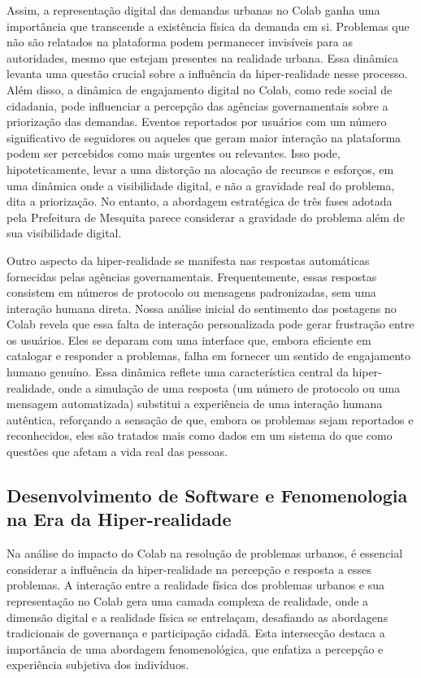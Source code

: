 Assim, a representação digital das demandas urbanas no Colab ganha uma importância que transcende a existência física da demanda em si. Problemas que não são relatados na plataforma podem permanecer invisíveis para as autoridades, mesmo que estejam presentes na realidade urbana. Essa dinâmica levanta uma questão crucial sobre a influência da hiper-realidade nesse processo. Além disso, a dinâmica de engajamento digital no Colab, como rede social de cidadania, pode influenciar a percepção das agências governamentais sobre a priorização das demandas. Eventos reportados por usuários com um número significativo de seguidores ou aqueles que geram maior interação na plataforma podem ser percebidos como mais urgentes ou relevantes. Isso pode, hipoteticamente, levar a uma distorção na alocação de recursos e esforços, em uma dinâmica onde a visibilidade digital, e não a gravidade real do problema, dita a priorização. No entanto, a abordagem estratégica de três fases adotada pela Prefeitura de Mesquita parece considerar a gravidade do problema além de sua visibilidade digital.

Outro aspecto da hiper-realidade se manifesta nas respostas automáticas fornecidas pelas agências governamentais. Frequentemente, essas respostas consistem em números de protocolo ou mensagens padronizadas, sem uma interação humana direta. Nossa análise inicial do sentimento das postagens no Colab revela que essa falta de interação personalizada pode gerar frustração entre os usuários. Eles se deparam com uma interface que, embora eficiente em catalogar e responder a problemas, falha em fornecer um sentido de engajamento humano genuíno. Essa dinâmica reflete uma característica central da hiper-realidade, onde a simulação de uma resposta (um número de protocolo ou uma mensagem automatizada) substitui a experiência de uma interação humana autêntica, reforçando a sensação de que, embora os problemas sejam reportados e reconhecidos, eles são tratados mais como dados em um sistema do que como questões que afetam a vida real das pessoas.

\subsection*{Desenvolvimento de Software e Fenomenologia na Era da Hiper-realidade}

Na análise do impacto do Colab na resolução de problemas urbanos, é essencial considerar a influência da hiper-realidade na percepção e resposta a esses problemas. A interação entre a realidade física dos problemas urbanos e sua representação no Colab gera uma camada complexa de realidade, onde a dimensão digital e a realidade física se entrelaçam, desafiando as abordagens tradicionais de governança e participação cidadã. Esta intersecção destaca a importância de uma abordagem fenomenológica, que enfatiza a percepção e experiência subjetiva dos indivíduos.

